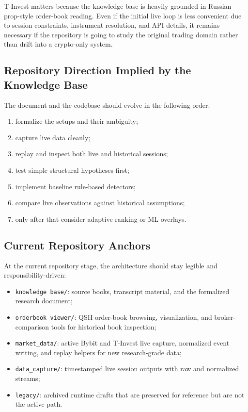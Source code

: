 T-Invest matters because the knowledge base is heavily grounded in Russian prop-style order-book reading.
Even if the initial live loop is less convenient due to session constraints, instrument resolution, and API details, it remains necessary if the repository is going to study the original trading domain rather than drift into a crypto-only system.

\subsection{Repository Direction Implied by the Knowledge Base}

The document and the codebase should evolve in the following order:
\begin{enumerate}
  \item formalize the setups and their ambiguity;
  \item capture live data cleanly;
  \item replay and inspect both live and historical sessions;
  \item test simple structural hypotheses first;
  \item implement baseline rule-based detectors;
  \item compare live observations against historical assumptions;
  \item only after that consider adaptive ranking or ML overlays.
\end{enumerate}

\subsection{Current Repository Anchors}

At the current repository stage, the architecture should stay legible and responsibility-driven:
\begin{itemize}
  \item \texttt{knowledge base/}: source books, transcript material, and the formalized research document;
  \item \texttt{orderbook\_viewer/}: QSH order-book browsing, visualization, and broker-comparison tools for historical book inspection;
  \item \texttt{market\_data/}: active Bybit and T-Invest live capture, normalized event writing, and replay helpers for new research-grade data;
  \item \texttt{data\_capture/}: timestamped live session outputs with raw and normalized streams;
  \item \texttt{legacy/}: archived runtime drafts that are preserved for reference but are not the active path.
\end{itemize}

